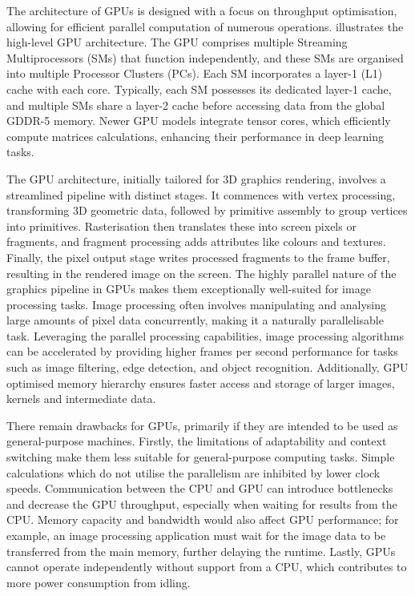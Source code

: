 The architecture of GPUs is designed with a focus on throughput optimisation, allowing for efficient parallel computation of numerous operations.  illustrates the high-level GPU architecture. The GPU comprises multiple Streaming Multiprocessors (SMs) that function independently, and these SMs are organised into multiple Processor Clusters (PCs). Each SM incorporates a layer-1 (L1) cache with each core. Typically, each SM possesses its dedicated layer-1 cache, and multiple SMs share a layer-2 cache before accessing data from the global GDDR-5 memory. Newer GPU models integrate tensor cores, which efficiently compute matrices calculations, enhancing their performance in deep learning tasks.

The GPU architecture, initially tailored for 3D graphics rendering, involves a streamlined pipeline with distinct stages. It commences with vertex processing, transforming 3D geometric data, followed by primitive assembly to group vertices into primitives. Rasterisation then translates these into screen pixels or fragments, and fragment processing adds attributes like colours and textures. Finally, the pixel output stage writes processed fragments to the frame buffer, resulting in the rendered image on the screen. The highly parallel nature of the graphics pipeline in GPUs makes them exceptionally well-suited for image processing tasks. Image processing often involves manipulating and analysing large amounts of pixel data concurrently, making it a naturally parallelisable task. Leveraging the parallel processing capabilities, image processing algorithms can be accelerated by providing higher frames per second performance for tasks such as image filtering, edge detection, and object recognition. Additionally, GPU optimised memory hierarchy ensures faster access and storage of larger images, kernels and intermediate data.

There remain drawbacks for GPUs, primarily if they are intended to be used as general-purpose machines. Firstly, the limitations of adaptability and context switching make them less suitable for general-purpose computing tasks. Simple calculations which do not utilise the parallelism are inhibited by lower clock speeds. Communication between the CPU and GPU can introduce bottlenecks and decrease the GPU throughput, especially when waiting for results from the CPU. Memory capacity and bandwidth would also affect GPU performance; for example, an image processing application must wait for the image data to be transferred from the main memory, further delaying the runtime. Lastly, GPUs cannot operate independently without support from a CPU, which contributes to more power consumption from idling. 

